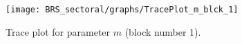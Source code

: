 \begin{figure}[H]
\centering
  \texttt{[image: BRS\_sectoral/graphs/TracePlot\_m\_blck\_1]}\\
    \caption{Trace plot for parameter ${m}$ (block number 1).}
\end{figure}
